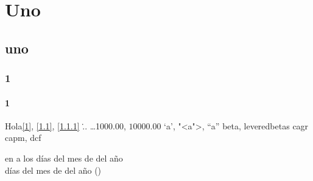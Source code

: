 \documentclass[10pt,letter]{report}
\begin{document}
\def\sectionautorefname{Inciso}
\def\subsectionautorefname{Inciso}

\fechaInforme


\chapter{Uno}\label{1}
\thispagestyle{fancy}
\section{uno}\label{1.1}
\subsection{1}\label{1.1.1}
\subsubsection{1}

Hola\autoref{1}, \autoref{1.1}, \autoref{1.1.1}
 \... \ldots  1000.00, $10000.00$
\newpage
`a', "<a">, ``a'' \gls{beta}, \glspl{leveredbeta} \acs{cagr} \acs{capm}, \acs{dcf}

en   \monthname[1] a los \numberstringnum{\diainforme} d\'ias del mes de \monthname[\mesinforme] del a\~no \numberstringnum{\annoinforme}
\\
\diainforme{} d\'ias del mes de \monthname[\mesinforme]{} del a\~no \annoinforme (\numberstringnum{\annoinforme})
\begin{center}
 \printnoidxglossary[type=\acronymtype,title={Acr\'onimos}]
\printnoidxglossary
\end{center}
\end{document}
